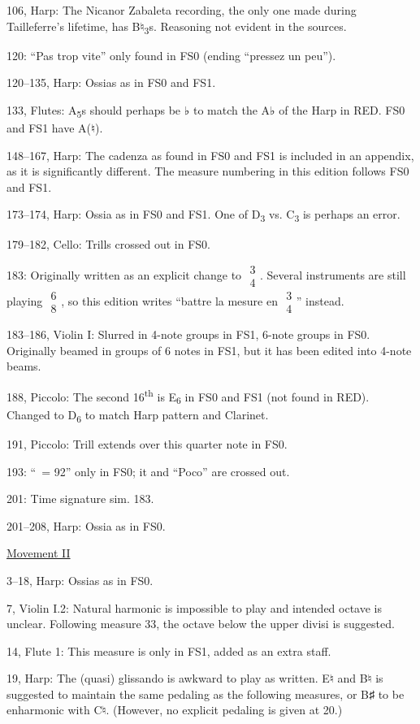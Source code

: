 \documentclass[twoside]{article}
\begin{document}
\begin{hangparas}{15pt}{1}
\begin{multicols}{2}
106, Harp: The Nicanor Zabaleta recording, the only one made during Tailleferre's lifetime, has B♮\textsubscript{3}s. Reasoning not evident in the sources.

120: ``Pas trop vite'' only found in FS0 (ending ``pressez un peu'').

120--135, Harp: Ossias as in FS0 and FS1.

133, Flutes: A\textsubscript{5}s should perhaps be ♭ to match the A♭ of the Harp in RED. FS0 and FS1 have A(♮).

148--167, Harp: The cadenza as found in FS0 and FS1 is included in an appendix, as it is significantly different. The measure numbering in this edition follows FS0 and FS1.

173--174, Harp: Ossia as in FS0 and FS1. One of D\textsubscript{3} vs. C\textsubscript{3} is perhaps an error.

179--182, Cello: Trills crossed out in FS0.

183: Originally written as an explicit change to $\substack{3\\4}$. Several instruments are still playing $\substack{6\\8}$, so this edition writes ``battre la mesure en $\substack{3\\4}$'' instead.

183--186, Violin I: Slurred in 4-note groups in FS1, 6-note groups in FS0. Originally beamed in groups of 6 notes in FS1, but it has been edited into 4-note beams.

188, Piccolo: The second 16\textsuperscript{th} is E\textsubscript{6} in FS0 and FS1 (not found in RED). Changed to D\textsubscript{6} to match Harp pattern and Clarinet.

191, Piccolo: Trill extends over this quarter note in FS0.

193: ``\Vier\ = 92'' only in FS0; it and ``Poco'' are crossed out.

201: Time signature sim. 183.

201--208, Harp: Ossia as in FS0.

\underline{Movement II}

3--18, Harp: Ossias as in FS0.

7, Violin I.2: Natural harmonic is impossible to play and intended octave is unclear. Following measure 33, the octave below the upper divisi is suggested.

14, Flute 1: This measure is only in FS1, added as an extra staff.

19, Harp: The (quasi) glissando is awkward to play as written. E♮ and B♮ is suggested to maintain the same pedaling as the following measures, or B♯ to be enharmonic with C♮. (However, no explicit pedaling is given at 20.)


\end{multicols}
\end{hangparas}
\end{document}
